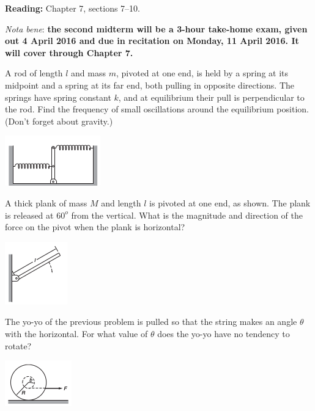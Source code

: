 \documentclass[12pt,letterpaper]{hmcpset}
\newcommand{\dg}[1]{\ensuremath{#1^o}}
\begin{document}



\noindent
\textbf{Reading:} Chapter 7, sections 7--10. \par
\noindent
\emph{Nota bene}: \textbf{the second midterm will
be a 3-hour take-home exam, given out 4 April 2016
and due in recitation on Monday, 11 April 2016. 
It will cover through Chapter 7.}

\begin{problem}
A rod of length $l$ and mass $m$, pivoted at one end, is held by a spring at
its midpoint and a spring at its far end, both pulling in opposite
directions. The springs have spring constant $k$, and at equilibrium their
pull is perpendicular to the rod. Find the frequency of small oscillations
around the equilibrium position. (Don't forget about gravity.)
\begin{center}
    \includegraphics{img/7_17}
\end{center}
\end{problem}
\begin{solution}
    \vfill
\end{solution}
\clearpage

\begin{problem}
A thick plank of mass $M$ and length $l$ is pivoted at one end, as shown. The
plank is released at $\dg{60}$ from the vertical. What is the magnitude and
direction of the force on the pivot when the plank is horizontal?
\begin{center}
    \includegraphics{img/7_20}
\end{center}
\end{problem}
\begin{solution}
    \vfill
\end{solution}
\clearpage

\begin{problem}
The yo-yo of the previous problem is pulled so that the string makes an angle
$\theta$ with the horizontal. For what value of $\theta$ does the yo-yo have
no tendency to rotate?
\begin{center}
    \includegraphics{img/7_28}
\end{center}
\end{problem}
\begin{solution}
    \vfill
\end{solution}
\clearpage
\end{document}
